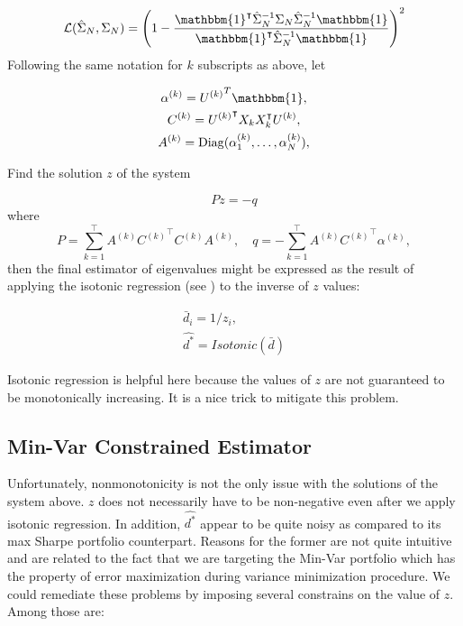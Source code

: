 \documentclass{article}
\begin{document}
$$
	\mathcal{L}(\hat{\Sigma}_N, \Sigma_N)
		= \left(
				1 - 
					\frac{\mathbbm{1}^\intercal \hat{\Sigma}_N^{-1} \Sigma_N \hat{\Sigma}_N^{-1} \mathbbm{1}}
						   {\mathbbm{1}^\intercal \hat{\Sigma}_N^{-1} \mathbbm{1}}
			\right)^2
$$
\noindent Following the same notation for $k$ subscripts as above, let 

\begin{gather*} 
	\alpha^{(k)} = {U^{(k)}}^T\mathbbm{1}, \\
	C^{(k)} = {U^{(k)}}^\intercal X_k X_k^\intercal U^{(k)}, \\
	A^{(k)} = \mathrm{Diag}(\alpha^{(k)}_1, \ldots, \alpha^{(k)}_N),
\end{gather*}

\noindent Find the solution $z$ of the system

$$Pz = -q$$ 
where 
$$
	P = \sum_{k=1}^\intercal A^{(k)} {C^{(k)}}^\intercal C^{(k)} A^{(k)},
	\quad q = -\sum_{k=1}^\intercal A^{(k)} {C^{(k)}}^\intercal \alpha^{(k)},
$$
then the final estimator of eigenvalues might be expressed as the result of applying the isotonic regression (see ) to the inverse of $z$ values:

\begin{gather*} 
\bar{d}_i = 1/z_i , \\
\hat{d^*} = Isotonic(\bar{d})
\end{gather*}

Isotonic regression is helpful here because the values of $z$ are not guaranteed to be monotonically increasing. It is a nice trick to mitigate this problem.

\subsection{Min-Var Constrained Estimator}

Unfortunately, nonmonotonicity is not the only issue with the solutions of the system above. $z$ does not necessarily have to be non-negative even after we apply isotonic regression. In addition, $\hat{d^*}$ appear to be quite noisy as compared to its max Sharpe portfolio counterpart. Reasons for the former are not quite intuitive and are related to the fact that we are targeting the Min-Var portfolio which has the property of error maximization during variance minimization procedure. We could remediate these problems by imposing several constrains on the value of $z$.
Among those are: 
\end{document}
